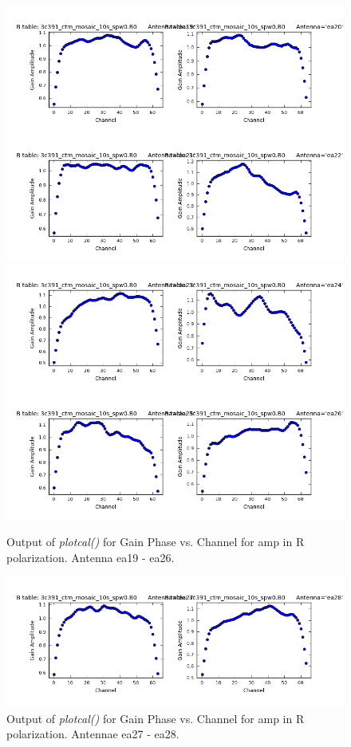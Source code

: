\documentclass[12pt, a4paper]{article}
\begin{document}
\begin{figure}[h!]
\centering
\includegraphics[scale=0.65]{../Imaging/plots2/part4-subE-question3a_amp_pol-R-ea19-ea22.png}
\includegraphics[scale=0.65]{../Imaging/plots2/part4-subE-question3a_amp_pol-R-ea23-ea26.png}
\caption{Output of \emph{plotcal()} for Gain Phase vs. Channel for amp in R polarization. Antenna ea19 - ea26.}
\end{figure}
\addtocounter{figure}{-1}

\begin{figure}[h!]
\centering
\includegraphics[scale=0.65]{../Imaging/plots2/part4-subE-question3a_amp_pol-R-ea27-ea28.png}
\caption{Output of \emph{plotcal()} for Gain Phase vs. Channel for amp in R polarization. Antennae ea27 - ea28. \label{fig:part4subE-q3a-amp-R}}
\end{figure}
\end{document}
